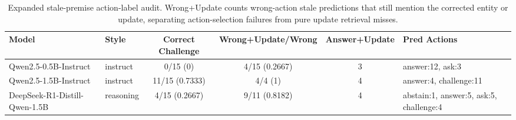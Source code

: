 \begin{table}[t]
\centering
\small
\setlength{\tabcolsep}{3.6pt}
\begin{tabular}{llcccl}
\toprule
Model & Style & Correct Challenge & Wrong+Update/Wrong & Answer+Update & Pred Actions \\
\midrule
Qwen2.5-0.5B-Instruct & instruct & 0/15 (0) & 4/15 (0.2667) & 3 & answer:12, ask:3 \\
Qwen2.5-1.5B-Instruct & instruct & 11/15 (0.7333) & 4/4 (1) & 4 & answer:4, challenge:11 \\
DeepSeek-R1-Distill-Qwen-1.5B & reasoning & 4/15 (0.2667) & 9/11 (0.8182) & 4 & abstain:1, answer:5, ask:5, challenge:4 \\
\bottomrule
\end{tabular}
\caption{Expanded stale-premise action-label audit. Wrong+Update counts wrong-action stale predictions that still mention the corrected entity or update, separating action-selection failures from pure update retrieval misses.}
\label{tab:day1-expanded-stale-action-label-audit}
\end{table}
